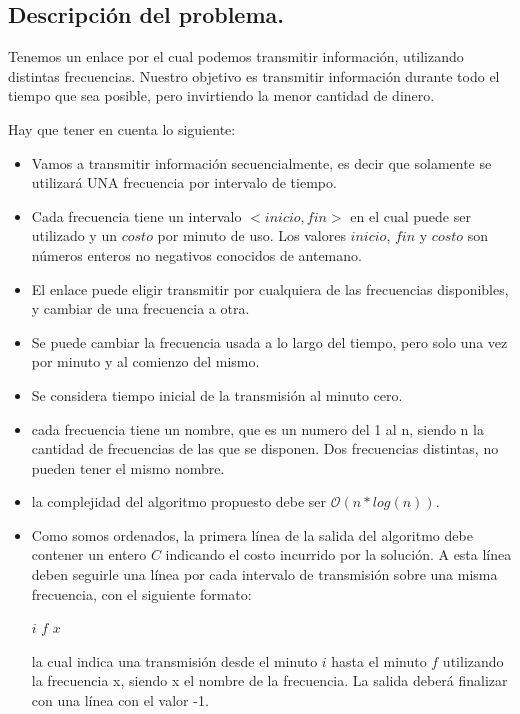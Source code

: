 \subsection{Descripción del problema.}

\vspace*{0.3cm}

Tenemos un enlace por el cual podemos transmitir información, utilizando distintas frecuencias.
Nuestro objetivo es transmitir información durante todo el tiempo que sea posible, pero invirtiendo la menor cantidad de dinero.

Hay que tener en cuenta lo siguiente:

\begin{itemize}
	\item Vamos a transmitir información secuencialmente, es decir que solamente se utilizará UNA frecuencia por intervalo de tiempo.
	\item Cada frecuencia tiene un intervalo $<inicio, fin>$ en el cual puede ser utilizado y un $costo$ por minuto de uso. Los valores $inicio$, $fin$ y $costo$ son números enteros no negativos conocidos de antemano.
	\item El enlace puede eligir transmitir por cualquiera de las frecuencias disponibles, y cambiar de una frecuencia a otra.
	\item Se puede cambiar la frecuencia usada a lo largo del tiempo, pero solo una vez por minuto y al comienzo del mismo.
	\item Se considera tiempo inicial de la transmisión al minuto cero.
	\item cada frecuencia tiene un nombre, que es un numero del 1 al n, siendo n la cantidad de frecuencias de las que se disponen. Dos frecuencias distintas, no pueden tener el mismo nombre.
	\item la complejidad del algoritmo propuesto debe ser $\mathcal{O}(n*log(n))$.
	\item Como somos ordenados, la primera línea de la salida del algoritmo debe contener un entero $C$ indicando el costo incurrido por la solución. A esta línea deben seguirle una línea por cada intervalo de transmisión sobre una misma frecuencia, con el siguiente formato:
	
$i$ $f$ $x$

la cual indica una transmisión desde el minuto $i$ hasta el minuto $f$ utilizando la frecuencia x, siendo x el nombre de la frecuencia. La salida deberá finalizar con una línea con el valor -1.
\end{itemize}

